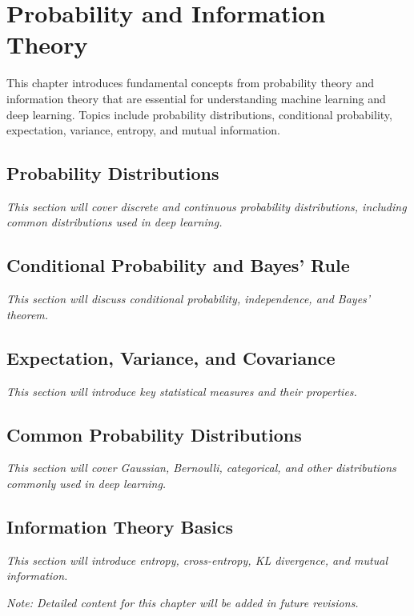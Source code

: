 
\chapter{Probability and Information Theory}
\label{chap:probability}

This chapter introduces fundamental concepts from probability theory and information theory that are essential for understanding machine learning and deep learning. Topics include probability distributions, conditional probability, expectation, variance, entropy, and mutual information.

\section{Probability Distributions}

\textit{This section will cover discrete and continuous probability distributions, including common distributions used in deep learning.}

\section{Conditional Probability and Bayes' Rule}

\textit{This section will discuss conditional probability, independence, and Bayes' theorem.}

\section{Expectation, Variance, and Covariance}

\textit{This section will introduce key statistical measures and their properties.}

\section{Common Probability Distributions}

\textit{This section will cover Gaussian, Bernoulli, categorical, and other distributions commonly used in deep learning.}

\section{Information Theory Basics}

\textit{This section will introduce entropy, cross-entropy, KL divergence, and mutual information.}

\vspace{1em}
\noindent\textit{Note: Detailed content for this chapter will be added in future revisions.}
